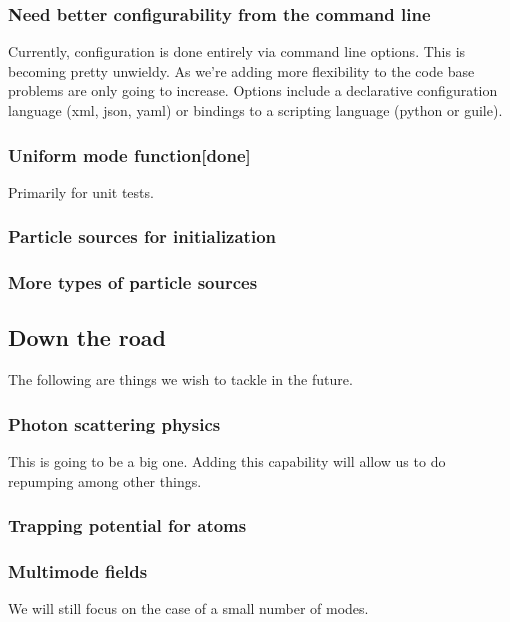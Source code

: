 \documentclass[aps, superscriptaddress, groupedaddress, preprint]{revtex4}
\begin{document}
\subsubsection{Need better configurability from the command line}

Currently, configuration is done entirely via command line
options.  This is becoming pretty unwieldy.  As we're adding more
flexibility to  the code base problems are only going to
increase.  Options include a declarative configuration language
(xml, json, yaml) or bindings to a scripting language (python or
guile).


\subsubsection{Uniform mode function{\bf [done]}}

Primarily for unit tests.


\subsubsection{Particle sources for initialization}


\subsubsection{More types of particle sources}


\subsection{Down the road}

The following are things we wish to tackle in the future.


\subsubsection{Photon scattering physics} This is going to be a big
one.  Adding this capability will allow us to do repumping among
other things.


\subsubsection{Trapping potential for atoms}


\subsubsection{Multimode fields} We will still focus on the case
of a small number of modes.
\end{document}
